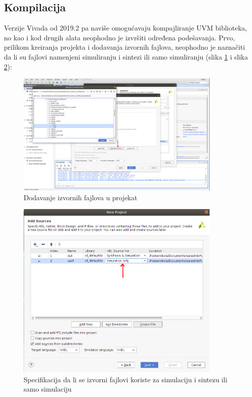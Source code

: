 \subsection{Kompilacija}

Verzije Vivada od  2019.2 pa naviše omogućavaju kompajliranje UVM biblioteka, no
kao i kod drugih alata neophodno je izvršiti određena podešavanja.
Prvo, prilikom kreiranja projekta i dodavanja izvornih fajlova, neophodno je naznačiti da li su
fajlovi namenjeni simuliranju i sintezi ili samo simuliranju (slika \ref{fig:v5_vivado_source_files_2} i slika \ref{fig:v5_vivado_source_files}):

\begin{figure}[h!]
  \centering
  \includegraphics[width=100mm, scale=0.5]{img/v5_vivado_source_files_2.png}
  \caption{Dodavanje izvornih fajlova u projekat}
  \label{fig:v5_vivado_source_files_2}
\end{figure}

\begin{figure}[h!]
  \centering
  \includegraphics[width=100mm, scale=0.5]{img/v5_vivado_source_files.png}
  \caption{Specifikacija da li se izvorni fajlovi koriste za simulaciju i sintezu ili samo simulaciju}
  \label{fig:v5_vivado_source_files}
\end{figure}

